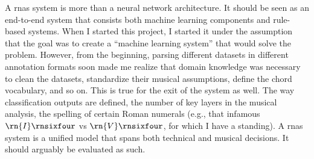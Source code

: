 
A \glspl{rna} system is more than a neural network
architecture. It should be seen as an end-to-end system that
consists both machine learning components and rule-based
systems. When I started this project, I started it under the
assumption that the goal was to create a ``machine learning
system'' that would solve the problem. However, from the
beginning, parsing different datasets in different
annotation formats soon made me realize that domain
knowledge was necessary to clean the datasets, standardize
their musical assumptions, define the chord vocabulary, and
so on. This is true for the exit of the system as well. The
way classification outputs are defined, the number of key
layers in the musical analysis, the spelling of certain
Roman numerals (e.g., that infamous $\rn{I}\rnsixfour$ vs
$\rn{V}\rnsixfour$, for which I have a standing). A
\glspl{rna} system is a unified model that spans both
technical and musical decisions. It should arguably be
evaluated as such.
